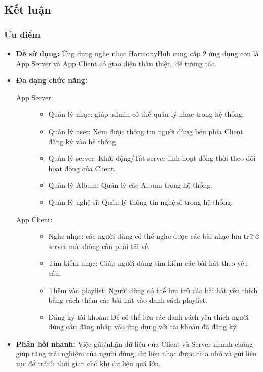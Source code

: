 \documentclass[a4paper]{article}
\begin{document}
\begin{flushleft}
	\subsection{Kết luận}
	\subsubsection{Ưu điểm}
	\begin{itemize}
		\item \textbf{Dễ sử dụng:} Ứng dụng nghe nhạc HarmonyHub cung cấp 2 ứng dụng con là App Server và App Client có giao diện thân thiện, dễ tương tác.
		\item \textbf{Đa dạng chức năng:}
		      \begin{description}
			      \item[App Server:]
			            \begin{itemize}
				            \item Quản lý nhạc: giúp admin có thể quản lý nhạc trong hệ thống.
				            \item Quản lý user: Xem được thông tin người dùng bên phía Client đăng ký vào hệ thống.
				            \item Quản lý server: Khởi động/Tắt server linh hoạt đồng thời theo dõi hoạt động của Client.
				            \item Quản lý Album: Quản lý các Album trong hệ thống.
				            \item Quản lý nghệ sĩ: Quản lý thông tin nghệ sĩ trong hệ thống.
			            \end{itemize}
			      \item[App Client:]
			            \begin{itemize}
				            \item Nghe nhạc: các người dùng có thể nghe được các bài nhạc lưu trữ ở server mà không cần phải tải về.
				            \item Tìm kiếm nhạc: Giúp người dùng tìm kiếm các bài hát theo yêu cầu.
				            \item Thêm vào playlist: Người dùng có thể lưu trữ các bài hát yêu thích bằng cách thêm các bài hát vào danh sách playlist.
				            \item Đăng ký tài khoản: Để có thể lưu các danh sách yêu thích người dùng cần đăng nhập vào ứng dụng với tài khoản đã đăng ký.
			            \end{itemize}
		      \end{description}
		\item \textbf{Phản hồi nhanh:} Việc gửi/nhận dữ liệu của Client và Server nhanh chóng giúp tăng trải nghiệm của người dùng, dữ liệu nhạc được chia nhỏ và gửi liên tục để tránh thời gian chờ khi dữ liệu quá lớn.
	\end{itemize}

\end{flushleft}
\end{document}
